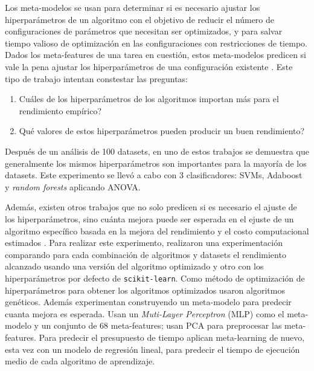 Los meta-modelos se usan para determinar si es necesario ajustar los hiperparámetros de un algoritmo con el objetivo de reducir el número de configuraciones de parámetros que necesitan ser optimizados, y para salvar tiempo valioso de optimización en las configuraciones con restricciones de tiempo. Dados los meta-features de una tarea en cuestión, estos meta-modelos predicen si vale la pena ajustar los hiperparámetros de una configuración existente \cite{ridd2014using, rijn2018hyp}. Este tipo de trabajo intentan constestar las preguntas: 
\begin{enumerate}
	\item \textquestiondown Cuáles de los hiperparámetros de los algoritmos importan más para el rendimiento empírico?
	\item \textquestiondown Qué valores de estos hiperparámetros pueden producir un buen rendimiento?
\end{enumerate}

Después de un análisis de 100 datasets, en uno de estos trabajos \cite{ridd2014using} se demuestra que generalmente los mismos hiperparámetros son importantes para la mayoría de los datasets. Este experimento se llevó a cabo con 3 clasificadores: SVMs, Adaboost y \textit{random forests} aplicando ANOVA.

Además, existen otros trabajos que no solo predicen si es necesario el ajuste de los hiperparámetros, sino cuánta mejora puede ser esperada en el ejuste de un algoritmo específico basada en la mejora del rendimiento y el costo computacional estimados \cite{sanders2017informing}. Para realizar este experimento, realizaron una experimentación comparando para cada combinación de algoritmos y datasets el rendimiento alcanzado usando una versión del algoritmo optimizado y otro con los hiperparámetros por defecto de \texttt{scikit-learn}. Como método de optimización de hiperparámetros para obtener los algoritmos optimizados usaron algoritmos genéticos. Además experimentan construyendo un meta-modelo para predecir cuanta mejora es esperada. Usan un \textit{Muti-Layer Perceptron} (MLP) como el meta-modelo y un conjunto de 68 meta-features; usan PCA para preprocesar las meta-features. Para predecir el presupuesto de tiempo aplican meta-learning de nuevo, esta vez con un modelo de regresión lineal, para predecir el tiempo de ejecución medio de cada algoritmo de aprendizaje.


%

